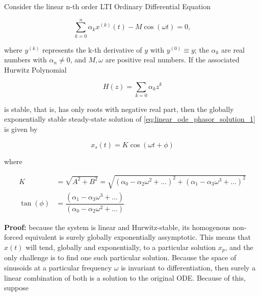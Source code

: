 \begin{theorem}\label{theo:phasors_solutions} %
Consider the linear n-th order LTI Ordinary Differential Equation

\begin{equation} \sum\limits_{k=0}^n \alpha_k x^{(k)}(t) - M\cos\left(\omega t\right) = 0,\label{eq:linear_ode_phasor_solution_1}\end{equation}

	\noindent where $y^{(k)}$ represents the k-th derivative of $y$ with $y^{(0)} \equiv y$; the $\alpha_k$ are real numbers with $\alpha_n \neq 0$, and $M,\omega$ are positive real numbers. If the associated Hurwitz Polynomial

\begin{equation} H\left(z\right) = \sum\limits_{k=0}  \alpha_k z^k \label{theo:linear_ode_phasor_solution_3}\end{equation}

	\noindent is stable, that is, has only roots with negative real part, then the globally exponentially stable steady-state solution of \eqref{eq:linear_ode_phasor_solution_1} is given by

\begin{equation} x_s(t) = K\cos\left(\omega t + \phi\right) \label{eq:linear_ode_phasor_solution_2}\end{equation}

	\noindent where 

\begin{align}
	K &= \sqrt{A^2 + B^2} = \sqrt{\left(\alpha_0 - \alpha_2\omega^2 + ...\right)^2 + \left(\alpha_1 - \alpha_3\omega^3 + ...\right)^2}\\[3mm]
	\tan\left(\phi\right) &= \dfrac{\left(\alpha_1 - \alpha_3\omega^3 + ...\right)}{\left(\alpha_0 - \alpha_2\omega^2 + ...\right)}
\end{align}

\end{theorem}
\textbf{Proof: } because the system is linear and Hurwitz-stable, its homogenous non-forced equivalent is surely globally exponentially assymptotic. This means that $x(t)$ will tend, globally and exponentially, to a particular solution $x_p$, and the only challenge is to find one such particular solution. Because the space of sinusoids at a particular frequency $\omega$ is invariant to differentiation, then surely a linear combination of both is a solution to the original ODE. Because of this, suppose

